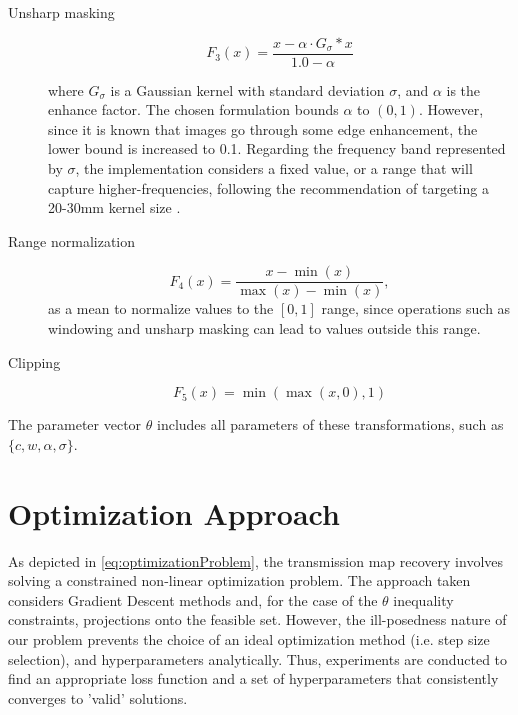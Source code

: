 \documentclass[nomenclature, english, bibtex]{kththesis}
\numberwithin{listing}{chapter}
\begin{document}
\begin{description}
\item[Unsharp masking]
\begin{equation}
    F_3(x) = \frac{x - \alpha \cdot G_\sigma * x}{1.0 - \alpha}
\end{equation}

where $G_\sigma$ is a Gaussian kernel with standard deviation $\sigma$, and $\alpha$ is the enhance factor.
The chosen formulation bounds $\alpha$ to $(0, 1)$. However, since it is known that images go through
some edge enhancement, the lower bound is increased to 0.1. Regarding the frequency band represented by
$\sigma$, the implementation considers a fixed value, or a range that will capture higher-frequencies,
following the recommendation of targeting a 20-30mm kernel size \cite[p.~153]{Prokop2003}.

\item[Range normalization]
\begin{equation}
    F_4(x) = \frac{x - \min(x)}{\max(x) - \min(x)},
\end{equation}
as a mean to normalize values to the $[0,1]$ range, since operations such as windowing and unsharp masking can lead
to values outside this range.

\item[Clipping]
\begin{equation}
    F_5(x) = \min(\max(x, 0), 1)
\end{equation}
\end{description}

The parameter vector $\theta$ includes all parameters of these transformations, such as $\{c, w, \alpha, \sigma\}$.

\section{Optimization Approach}

As depicted in \autoref{eq:optimizationProblem}, the transmission map recovery involves solving a constrained
non-linear optimization problem. The approach taken considers Gradient Descent methods and, for the case of
the $\theta$ inequality constraints, projections onto the feasible set. However, the ill-posedness nature of our
problem prevents the choice of an ideal optimization method (i.e. step size selection), and hyperparameters
analytically. Thus, experiments are conducted to find an appropriate loss function and a set of hyperparameters
that consistently converges to 'valid' solutions.
\end{document}
